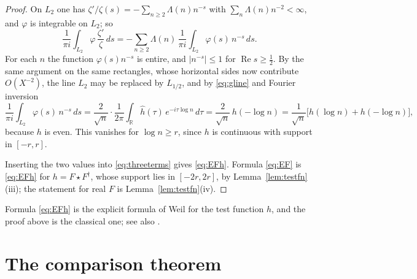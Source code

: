 \documentclass[11pt]{amsart}
\theoremstyle{remark}
\numberwithin{equation}{section}
\newcommand{\R}{\mathbb R}
\newcommand{\Rel}{\operatorname{Re}}
\begin{document}
\begin{proof}
On $L_2$ one has $\zeta'/\zeta(s)=-\sum_{n\ge2}\Lambda(n)n^{-s}$ with
$\sum_n\Lambda(n)n^{-2}<\infty$, and $\varphi$ is integrable on $L_2$; so
\[
  \frac1{\pi i}\int_{L_2}\varphi \,\frac{\zeta'}{\zeta}\,ds
  =-\sum_{n\ge2}\Lambda(n)\,\frac1{\pi i}\int_{L_2}\varphi(s)\,n^{-s}\,ds .
\]
For each $n$ the function $\varphi(s)n^{-s}$ is entire, and $|n^{-s}|\le1$ for
$\Rel s\ge\tfrac12$.  By the same argument on the same rectangles, whose horizontal sides now
contribute $O(X^{-2})$, the line $L_2$ may be replaced by $L_{1/2}$, and by \eqref{eq:gline} and Fourier inversion
\[
  \frac1{\pi i}\int_{L_2}\varphi(s)\,n^{-s}\,ds
  =\frac{2}{\sqrt n}\cdot\frac1{2\pi}\int_\R\hat h(\tau)\,
   e^{-i\tau\log n}\,d\tau
  =\frac{2}{\sqrt n}\,h(-\log n)
  =\frac1{\sqrt n}\bigl[h(\log n)+h(-\log n)\bigr],
\]
because $h$ is even.  This vanishes for $\log n\ge r$, since $h$ is
continuous with support in $[-r,r]$.

Inserting the two values into \eqref{eq:threeterms} gives \eqref{eq:EFh}.
Formula \eqref{eq:EF} is \eqref{eq:EFh} for $h=F\star F^\dagger$, whose
support lies in $[-2r,2r]$, by Lemma~\ref{lem:testfn}(iii); the statement
for real $F$ is Lemma~\ref{lem:testfn}(iv).
\end{proof}

Formula \eqref{eq:EFh} is the explicit formula of Weil \cite{Weil1952} for
the test function $h$, and the proof above is the classical one; see also
\cite{Barner1981}.

\section{The comparison theorem}
\label{sec:comparison}
\end{document}
